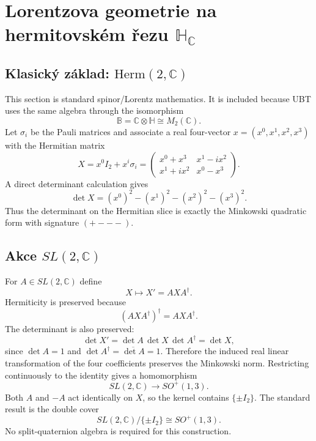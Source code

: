 
\chapter{Lorentzova geometrie na hermitovském řezu \(\mathbb H_{\mathbb C}\)}
\label{ch:lorentz-hc}

\section{Klasický základ: \(\mathrm{Herm}(2,\mathbb C)\)}
This section is standard spinor/Lorentz mathematics.  It is included because
UBT uses the same algebra through the isomorphism
\[
 \mathbb B=\mathbb C\otimes\mathbb H\cong M_2(\mathbb C).
\]
Let $\sigma_i$ be the Pauli matrices and associate a real four-vector
$x=(x^0,x^1,x^2,x^3)$ with the Hermitian matrix
\[
 X=x^0 I_2+x^i\sigma_i
 =\begin{pmatrix}
 x^0+x^3 & x^1-i x^2\\
 x^1+i x^2 & x^0-x^3
 \end{pmatrix}.
\]
A direct determinant calculation gives
\[
 \boxed{\det X=(x^0)^2-(x^1)^2-(x^2)^2-(x^3)^2.}
\]
Thus the determinant on the Hermitian slice is exactly the Minkowski quadratic
form with signature $(+---)$.

\section{Akce \(SL(2,\mathbb C)\)}
For $A\in SL(2,\mathbb C)$ define
\[
 X\longmapsto X'=A X A^\dagger .
\]
Hermiticity is preserved because
\[
 (A X A^\dagger)^\dagger=A X A^\dagger.
\]
The determinant is also preserved:
\[
 \det X'=\det A\,\det X\,\det A^\dagger
 =\det X,
\]
since $\det A=1$ and $\det A^\dagger=\overline{\det A}=1$.
Therefore the induced real linear transformation of the four coefficients
preserves the Minkowski norm.  Restricting continuously to the identity gives a
homomorphism
\[
 SL(2,\mathbb C)\longrightarrow SO^+(1,3).
\]
Both $A$ and $-A$ act identically on $X$, so the kernel contains
$\{\pm I_2\}$.  The standard result is the double cover
\[
 \boxed{SL(2,\mathbb C)/\{\pm I_2\}\cong SO^+(1,3).}
\]
No split-quaternion algebra is required for this construction.


